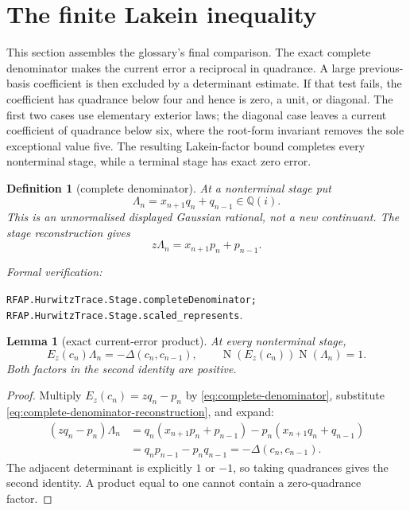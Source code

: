 \documentclass[11pt]{article}
\newtheorem{lemma}[lemma]{Lemma}
\newtheorem{definition}[definition]{Definition}
\newcommand{\Qi}{\mathbb{Q}(i)}
\newcommand{\Norm}[1]{\operatorname{N}\!\left(#1\right)}
\newcommand{\leanref}[1]{\par\smallskip\noindent
  \emph{Formal verification:}\par\nobreak
  {\raggedright\nolinkurl{#1}.\par}}
\begin{document}
\section{The finite Lakein inequality}
\label{sec:lakein-proof}

This section assembles the glossary's final comparison.  The exact complete
denominator makes the current error a reciprocal in quadrance.  A large
previous-basis coefficient is then excluded by a determinant estimate.  If
that test fails, the coefficient has quadrance below four and hence is zero,
a unit, or diagonal.  The first two cases use elementary exterior laws; the
diagonal case leaves a current coefficient of quadrance below six, where the
root-form invariant removes the sole exceptional value five.  The resulting
Lakein-factor bound completes every nonterminal stage, while a terminal stage
has exact zero error.

\begin{definition}[complete denominator]
\label{def:complete-denominator}
At a nonterminal stage put
\begin{equation}
\label{eq:complete-denominator}
                    \Lambda_n=x_{n+1}q_n+q_{n-1}\in\Qi.
\end{equation}
This is an unnormalised displayed Gaussian rational, not a new continuant.
The stage reconstruction gives
\begin{equation}
\label{eq:complete-denominator-reconstruction}
                    z\Lambda_n=x_{n+1}p_n+p_{n-1}.
\end{equation}
\end{definition}

\leanref{RFAP.HurwitzTrace.Stage.completeDenominator;
RFAP.HurwitzTrace.Stage.scaled_represents}

\begin{lemma}[exact current-error product]
\label{lem:current-error-product}
At every nonterminal stage,
\begin{equation}
\label{eq:current-error-product}
 E_z(c_n)\Lambda_n=-\Delta(c_n,c_{n-1}),
 \qquad
 \Norm{E_z(c_n)}\Norm{\Lambda_n}=1.
\end{equation}
Both factors in the second identity are positive.
\end{lemma}

\begin{proof}
Multiply $E_z(c_n)=zq_n-p_n$ by \eqref{eq:complete-denominator}, substitute
\eqref{eq:complete-denominator-reconstruction}, and expand:
\begin{align*}
 (zq_n-p_n)\Lambda_n
   &=q_n(x_{n+1}p_n+p_{n-1})
       -p_n(x_{n+1}q_n+q_{n-1})\\
   &=q_np_{n-1}-p_nq_{n-1}
    =-\Delta(c_n,c_{n-1}).
\end{align*}
The adjacent determinant is explicitly $1$ or $-1$, so taking quadrances
gives the second identity.  A product equal to one cannot contain a
zero-quadrance factor.
\end{proof}
\end{document}
